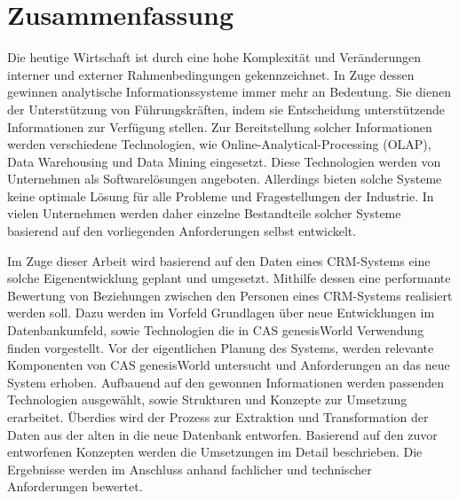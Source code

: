 
\chapter*{\centering Zusammenfassung}

Die heutige Wirtschaft ist durch eine hohe Komplexität und Veränderungen interner und externer Rahmenbedingungen gekennzeichnet. In Zuge dessen gewinnen analytische Informationssysteme immer mehr an Bedeutung. Sie dienen der Unterstützung von Führungskräften, indem sie Entscheidung unterstützende Informationen zur Verfügung stellen. Zur Bereitstellung solcher Informationen werden verschiedene Technologien, wie Online-Analytical-Processing (OLAP), Data Warehousing und Data Mining eingesetzt. Diese Technologien werden von Unternehmen als Softwarelösungen angeboten. Allerdings bieten solche Systeme keine optimale Lösung für alle Probleme und Fragestellungen der Industrie. In vielen Unternehmen werden daher einzelne Bestandteile solcher Systeme basierend auf den vorliegenden Anforderungen selbst entwickelt.

Im Zuge dieser Arbeit wird basierend auf den Daten eines CRM-Systems eine solche Eigenentwicklung geplant und umgesetzt. Mithilfe dessen eine performante Bewertung von Beziehungen zwischen den Personen eines CRM-Systems realisiert werden soll. Dazu werden im Vorfeld Grundlagen über neue Entwicklungen im Datenbankumfeld, sowie Technologien die in CAS genesisWorld Verwendung finden vorgestellt. Vor der eigentlichen Planung des Systems, werden relevante Komponenten von CAS genesisWorld untersucht und Anforderungen an das neue System erhoben. Aufbauend auf den gewonnen Informationen  werden passenden Technologien ausgewählt, sowie Strukturen und Konzepte zur Umsetzung erarbeitet. Überdies wird der Prozess zur Extraktion und Transformation der Daten aus der alten in die neue Datenbank entworfen. Basierend auf den zuvor entworfenen Konzepten werden die Umsetzungen im Detail beschrieben. Die Ergebnisse werden im Anschluss anhand fachlicher und technischer Anforderungen bewertet.